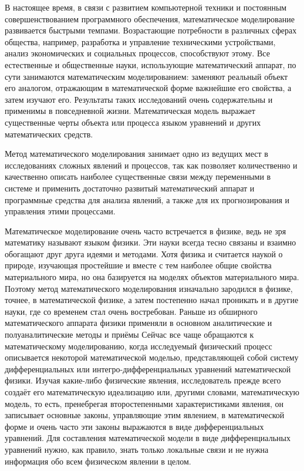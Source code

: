 \documentclass[12pt, a4paper]{extarticle}
\numberwithin{equation}{section}
\begin{document}
В настоящее время, в связи с развитием компьютерной техники и постоянным совершенствованием программного обеспечения, математическое моделирование развивается быстрыми темпами. Возрастающие потребности в различных сферах общества, например, разработка и управление техническими устройствами, анализ экономических и социальных процессов, способствуют этому. Все естественные и общественные науки, использующие математический аппарат, по сути занимаются математическим моделированием: заменяют реальный объект его аналогом, отражающим в математической форме важнейшие его свойства, а затем изучают его.  Результаты таких исследований очень содержательны и применимы в повседневной жизни. Математическая модель выражает существенные черты объекта или процесса языком уравнений и других математических средств. 

Метод математического моделирования занимает одно из ведущих мест в исследованиях сложных явлений и процессов, так как позволяет количественно и качественно описать наиболее существенные связи между переменными в системе и применить достаточно развитый математический аппарат и программные средства для анализа явлений, а также для их прогнозирования и управления этими процессами. 

Математическое моделирование очень часто встречается в физике, ведь не зря математику называют языком физики. Эти науки всегда тесно связаны и взаимно обогащают друг друга идеями и методами. Хотя физика и считается наукой о природе, изучающая простейшие и вместе с тем наиболее общие свойства материального мира, но она базируется на моделях объектов материального мира. Поэтому метод математического моделирования изначально зародился в физике, точнее, в математической физике, а затем постепенно начал проникать и в другие науки, где со временем стал очень востребован. Раньше из обширного математического аппарата физики применяли в основном аналитические и полуаналитические методы и приёмы Сейчас все чаще обращаются к математическому моделированию, когда исследуемый физический процесс описывается некоторой математической моделью, представляющей собой систему дифференциальных или интегро-дифференциальных уравнений математической физики. Изучая какие-либо физические явления, исследователь прежде всего создаёт его математическую идеализацию или, другими словами, математическую модель, то есть, пренебрегая второстепенными характеристиками явления, он записывает основные законы, управляющие этим явлением, в математической форме и очень часто эти законы выражаются в виде дифференциальных уравнений. Для составления математической модели в виде дифференциальных уравнений нужно, как правило, знать только локальные связи и не нужна информация обо всем физическом явлении в целом.
\end{document}
